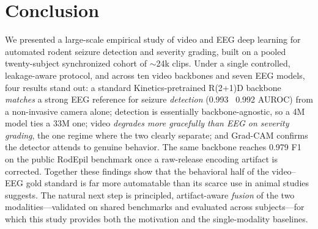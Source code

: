 \section{Conclusion}
\label{sec:conclusion}

We presented a large-scale empirical study of video and EEG deep learning
for automated rodent seizure detection and severity grading, built on a pooled
twenty-subject synchronized cohort of $\sim$24k clips. Under a single controlled,
leakage-aware protocol, and across ten video backbones and seven EEG models, four
results stand out: a standard Kinetics-pretrained R(2+1)D backbone \emph{matches}
a strong EEG reference for seizure \emph{detection} (0.993 \vs\ 0.992 AUROC) from
a non-invasive camera alone; detection is essentially backbone-agnostic, so a 4M
model ties a 33M one; video \emph{degrades more gracefully than EEG on severity
grading}, the one regime where the two clearly separate; and Grad-CAM confirms
the detector attends to genuine behavior. The same backbone reaches 0.979 F1 on
the public RodEpil benchmark once a raw-release encoding artifact is corrected.
Together these findings show that the behavioral half of the video--EEG gold
standard is far more automatable than its scarce use in animal studies suggests.
The natural next step is principled, artifact-aware \emph{fusion} of the two
modalities---validated on shared benchmarks and evaluated across subjects---for
which this study provides both the motivation and the single-modality baselines.
